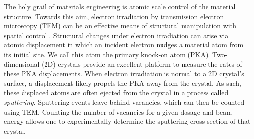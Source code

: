 \documentclass{article}
\begin{document}
The holy grail of materials engineering is atomic scale control of the
material structure.
Towards this aim, electron irradiation by transmission electron microscopy
(TEM) can be an effective means of structural manipulation with spatial control
\cite{Banhart1999, Egerton2013, Zhao2017, Susi2019}.
Structural changes under electron irradiation can arise via atomic displacement
in which an incident electron nudges a material atom from its initial site.  We
call this atom the primary knock-on atom (PKA).  Two-dimensional (2D) crystals
provide an excellent platform to measure the rates of these PKA displacements.
When electron irradiation is normal to a 2D crystal's surface, a displacement
likely propels the PKA away from the crystal.
As such, these displaced atoms are often ejected from the crystal in a process
called \textit{sputtering}.  Sputtering events leave behind vacancies, which
can then be counted using TEM.
Counting the number of vacancies for a given dosage and beam energy allows one
to experimentally determine the sputtering cross section of that crystal.
\end{document}
